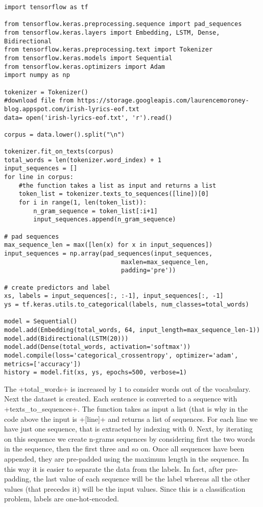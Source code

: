 \begin{lstlisting}
import tensorflow as tf

from tensorflow.keras.preprocessing.sequence import pad_sequences
from tensorflow.keras.layers import Embedding, LSTM, Dense, Bidirectional
from tensorflow.keras.preprocessing.text import Tokenizer
from tensorflow.keras.models import Sequential
from tensorflow.keras.optimizers import Adam
import numpy as np 

tokenizer = Tokenizer()
#download file from https://storage.googleapis.com/laurencemoroney-blog.appspot.com/irish-lyrics-eof.txt
data= open('irish-lyrics-eof.txt', 'r').read()

corpus = data.lower().split("\n")

tokenizer.fit_on_texts(corpus)
total_words = len(tokenizer.word_index) + 1
input_sequences = []
for line in corpus:
	#the function takes a list as input and returns a list
	token_list = tokenizer.texts_to_sequences([line])[0] 
	for i in range(1, len(token_list)):
		n_gram_sequence = token_list[:i+1]
		input_sequences.append(n_gram_sequence)

# pad sequences 
max_sequence_len = max([len(x) for x in input_sequences])
input_sequences = np.array(pad_sequences(input_sequences, 
								maxlen=max_sequence_len,
								padding='pre'))
								
# create predictors and label
xs, labels = input_sequences[:, :-1], input_sequences[:, -1]
ys = tf.keras.utils.to_categorical(labels, num_classes=total_words)
 
model = Sequential()
model.add(Embedding(total_words, 64, input_length=max_sequence_len-1))
model.add(Bidirectional(LSTM(20)))
model.add(Dense(total_words, activation='softmax'))
model.compile(loss='categorical_crossentropy', optimizer='adam', metrics=['accuracy'])
history = model.fit(xs, ys, epochs=500, verbose=1)
\end{lstlisting}
The \cd+total_words+ is increased by $1$ to consider words out of the vocabulary. Next the dataset is created. Each sentence is converted to a sequence with \cd+texts_to_sequences+. The function takes as input a list (that is why in the code above the input is \cd+[line]+ and returns a list of sequences. For each line we have just one sequence, that is extracted by indexing with $0$. Next, by iterating on this sequence we create n-grams sequences by considering first the two words in the sequence, then the first three and so on. Once all sequences have been appended, they are pre-padded using the maximum length in the sequence. In this way it is easier to separate the data from the labels. In fact, after pre-padding, the last value of each sequence will be the label whereas all the other values (that precedes it) will be the input values. Since this is a classification problem, labels are one-hot-encoded.

